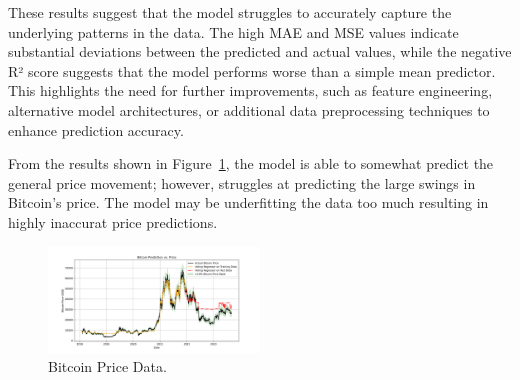 These results suggest that the model struggles to accurately capture the underlying patterns in
the data. The high MAE and MSE values indicate substantial deviations between the predicted and
actual values, while the negative R² score suggests that the model performs worse than a simple
mean predictor. This highlights the need for further improvements, such as feature engineering,
alternative model architectures, or additional data preprocessing techniques to enhance prediction
accuracy.

From the results shown in Figure\ \ref{fig:prediction_vs_actual}, the model is able to somewhat 
predict the general price movement; however, struggles at predicting the large swings in Bitcoin's
price. The model may be underfitting the data too much resulting in highly inaccurat price predictions.

\begin{figure}[h]
    \centering
    \includegraphics[width=0.5\textwidth]{plots/prediction_vs_actual.png} %
    \caption{Bitcoin Price Data.}
    \label{fig:prediction_vs_actual}
\end{figure}


